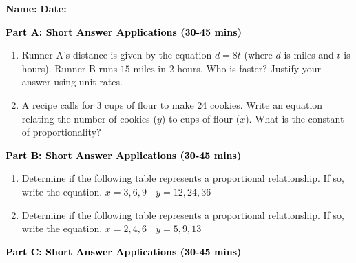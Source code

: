 \documentclass[12pt, letterpaper, fleqn]{article}
\begin{document}
\textbf{Name:} \underline{\hspace{5cm}}
\hfill
\textbf{Date:} \underline{\hspace{3cm}}\\


\begin{tcolorbox}[colback=customteal!20]
\large\textcolor{black}{\textbf{Part A: Short Answer Applications (30-45 mins)}}
\end{tcolorbox}

\vspace{3mm}

\begin{enumerate}[itemsep=4.2cm, leftmargin=0.6cm]
\item Runner A's distance is given by the equation $d = 8t$ (where $d$ is miles and $t$ is hours). Runner B runs $15\text{ miles}$ in 2 hours. Who is faster? Justify your answer using unit rates.
\item A recipe calls for 3 cups of flour to make 24 cookies. Write an equation relating the number of cookies ($y$) to cups of flour ($x$). What is the constant of proportionality?
\end{enumerate}

\newpage

\begin{tcolorbox}[colback=customteal!20]
\large\textcolor{black}{\textbf{Part B: Short Answer Applications (30-45 mins)}}
\end{tcolorbox}

\vspace{3mm}

\begin{enumerate}[itemsep=4.2cm, leftmargin=0.6cm, resume]
\item Determine if the following table represents a proportional relationship. If so, write the equation.
$x = 3, 6, 9$ | $y = 12, 24, 36$
\item Determine if the following table represents a proportional relationship. If so, write the equation.
$x = 2, 4, 6$ | $y = 5, 9, 13$
\end{enumerate}

\newpage

\begin{tcolorbox}[colback=customteal!20]
\large\textcolor{black}{\textbf{Part C: Short Answer Applications (30-45 mins)}}
\end{tcolorbox}

\vspace{3mm}
\end{document}
